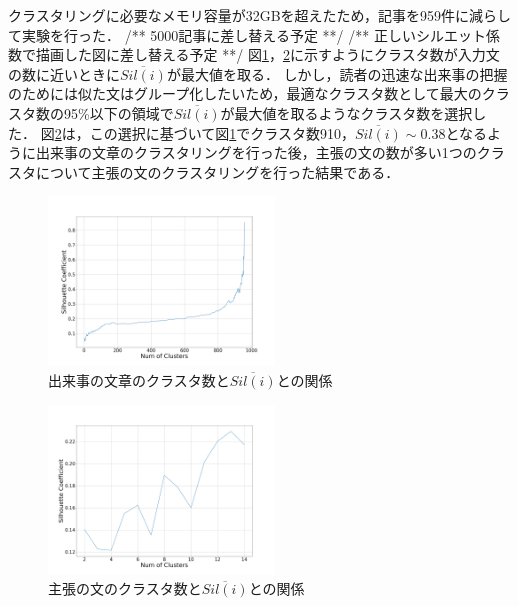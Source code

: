 \documentclass[a4paper, twocolumn, 10pt]{jarticle}
\begin{document}
クラスタリングに必要なメモリ容量が32GBを超えたため，記事を959件に減らして実験を行った．
/** 5000記事に差し替える予定 **/ 
/** 正しいシルエット係数で描画した図に差し替える予定 **/
図\ref{num_article_clusters_and_silhouette}，\ref{num_sentence_clusters_and_silhouette}に示すようにクラスタ数が入力文の数に近いときに$\overline{Sil(i)}$が最大値を取る．
しかし，読者の迅速な出来事の把握のためには似た文はグループ化したいため，最適なクラスタ数として最大のクラスタ数の95\%以下の領域で$\overline{Sil(i)}$が最大値を取るようなクラスタ数を選択した．
図\ref{num_sentence_clusters_and_silhouette}は，この選択に基づいて図\ref{num_article_clusters_and_silhouette}でクラスタ数910，$\overline{Sil(i)} \sim 0.38$となるように出来事の文章のクラスタリングを行った後，主張の文の数が多い1つのクラスタについて主張の文のクラスタリングを行った結果である．

\begin{figure}[H]
	\centering
	\includegraphics[keepaspectratio, width=60mm]{img/process-06_articles-cluster_num-of-clusters-dependency-on-silhouette-coefficient_with-maximal-silhoette_reduced-data-to-959.png}
	\caption{
    出来事の文章のクラスタ数と$\overline{Sil(i)}$との関係
  }
	\label{num_article_clusters_and_silhouette}
\end{figure}

\begin{figure}[H]
	\centering
	\includegraphics[keepaspectratio, width=60mm]{img/process-07_sentences-cluster_num-of-clusters-dependency-on-silhouette-coefficient_reduced-data-to-959.png}
	\caption{
    主張の文のクラスタ数と$\overline{Sil(i)}$との関係
  }
	\label{num_sentence_clusters_and_silhouette}
\end{figure}
\end{document}

